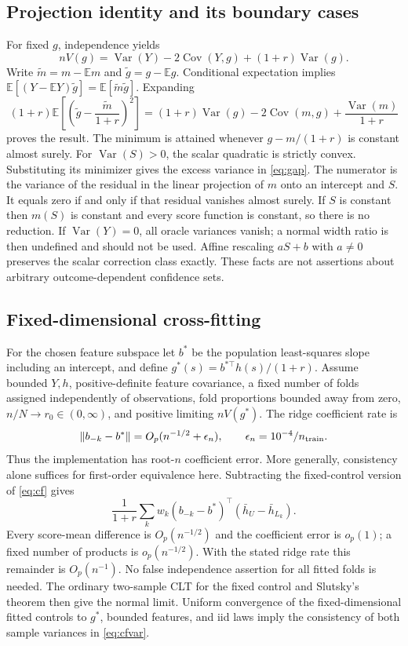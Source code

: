\documentclass{article}
\newcommand{\E}{\mathbb{E}}
\newcommand{\V}{\operatorname{Var}}
\newcommand{\Cov}{\operatorname{Cov}}
\begin{document}
\subsection{Projection identity and its boundary cases}
For fixed $g$, independence yields
\[
nV(g)=\V(Y)-2\Cov(Y,g)+(1+r)\V(g).
\]
Write $\widetilde m=m-\E m$ and $\widetilde g=g-\E g$. Conditional expectation implies $\E[(Y-\E Y)\widetilde g]=\E[\widetilde m\widetilde g]$. Expanding
\[
(1+r)\E\left[\left(\widetilde g-\frac{\widetilde m}{1+r}\right)^2\right]
=(1+r)\V(g)-2\Cov(m,g)+\frac{\V(m)}{1+r}
\]
proves the result. The minimum is attained whenever $g-m/(1+r)$ is constant almost surely. For $\V(S)>0$, the scalar quadratic is strictly convex. Substituting its minimizer gives the excess variance in \cref{eq:gap}. The numerator is the variance of the residual in the linear projection of $m$ onto an intercept and $S$. It equals zero if and only if that residual vanishes almost surely. If $S$ is constant then $m(S)$ is constant and every score function is constant, so there is no reduction. If $\V(Y)=0$, all oracle variances vanish; a normal width ratio is then undefined and should not be used. Affine rescaling $aS+b$ with $a\ne0$ preserves the scalar correction class exactly. These facts are not assertions about arbitrary outcome-dependent confidence sets.

\subsection{Fixed-dimensional cross-fitting}
For the chosen feature subspace let $b^*$ be the population least-squares slope including an intercept, and define $g^*(s)=b^{*\top}h(s)/(1+r)$. Assume bounded $Y,h$, positive-definite feature covariance, a fixed number of folds assigned independently of observations, fold proportions bounded away from zero, $n/N\to r_0\in(0,\infty)$, and positive limiting $nV(g^*)$. The ridge coefficient rate is
\[
\|b_{-k}-b^*\|=O_p(n^{-1/2}+\epsilon_n),
\qquad\epsilon_n=10^{-4}/n_{\rm train}.
\]
Thus the implementation has root-$n$ coefficient error. More generally, consistency alone suffices for first-order equivalence here. Subtracting the fixed-control version of \cref{eq:cf} gives
\[
\frac1{1+r}\sum_k w_k(b_{-k}-b^*)^\top
\left(\bar h_U-\bar h_{L_k}\right).
\]
Every score-mean difference is $O_p(n^{-1/2})$ and the coefficient error is $o_p(1)$; a fixed number of products is $o_p(n^{-1/2})$. With the stated ridge rate this remainder is $O_p(n^{-1})$. No false independence assertion for all fitted folds is needed. The ordinary two-sample CLT for the fixed control and Slutsky's theorem then give the normal limit. Uniform convergence of the fixed-dimensional fitted controls to $g^*$, bounded features, and iid laws imply the consistency of both sample variances in \cref{eq:cfvar}.
\end{document}
